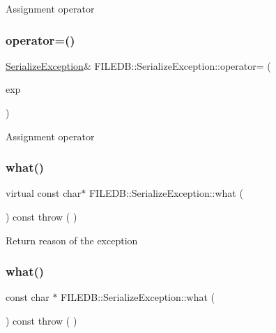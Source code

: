 Assignment operator \mbox{\label{classFILEDB_1_1SerializeException_a6ec9d7b0679c5752e900d30b92015302}} 
\subsubsection{\texorpdfstring{operator=()}{operator=()}\hspace{0.1cm}{\footnotesize\ttfamily [3/3]}}
{\footnotesize\ttfamily \mbox{\hyperlink{classFILEDB_1_1SerializeException}{Serialize\+Exception}}\& F\+I\+L\+E\+D\+B\+::\+Serialize\+Exception\+::operator= (\begin{DoxyParamCaption}\item[{const \mbox{\hyperlink{classFILEDB_1_1SerializeException}{Serialize\+Exception}} \&}]{exp }\end{DoxyParamCaption})}

Assignment operator \mbox{\label{classFILEDB_1_1SerializeException_a1c143c27480a4c2d85f20a19b3061add}} 
\subsubsection{\texorpdfstring{what()}{what()}\hspace{0.1cm}{\footnotesize\ttfamily [1/3]}}
{\footnotesize\ttfamily virtual const char$\ast$ F\+I\+L\+E\+D\+B\+::\+Serialize\+Exception\+::what (\begin{DoxyParamCaption}\item[{void}]{ }\end{DoxyParamCaption}) const throw ( ) \hspace{0.3cm}{\ttfamily [virtual]}}

Return reason of the exception \mbox{\label{classFILEDB_1_1SerializeException_a71ecca567a36c3b247d936b5e98e4707}} 
\subsubsection{\texorpdfstring{what()}{what()}\hspace{0.1cm}{\footnotesize\ttfamily [2/3]}}
{\footnotesize\ttfamily const char $\ast$ F\+I\+L\+E\+D\+B\+::\+Serialize\+Exception\+::what (\begin{DoxyParamCaption}\item[{void}]{ }\end{DoxyParamCaption}) const throw ( ) \hspace{0.3cm}{\ttfamily [virtual]}}

